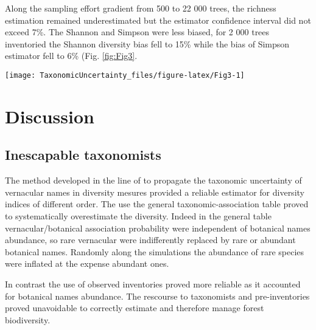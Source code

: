 \documentclass[fleqn,10pt]{ArtEcoFoG} %
\begin{document}
Along the sampling effort gradient from 500 to 22 000 trees, the
richness estimation remained underestimated but the estimator confidence
interval did not exceed 7\%. The Shannon and Simpson were less biased,
for 2 000 trees inventoried the Shannon diversity bias fell to 15\%
while the bias of Simpson estimator fell to 6\% (Fig. \ref{fig:Fig3}.

\begin{figure*}
\texttt{[image: TaxonomicUncertainty\_files/figure-latex/Fig3-1]} \caption{Degradation along a sampling effort gradient of the Richness, Shannon and Simpson diversities estimated for the reference inventory in vernacular names. The propagation method to estimate the diversities is only based on the reference field inventory. Above plots correspond to the estimated diversity in equivalent number of species and below plots correspond to the relative bias of the estimation compared to the value of the reference field inventory. For both dashed lines represent the value of the reference field inventory and crosses and red lines respectively represent the mean, 0.05 and 0.95 quantiles estimated after 1000 iterations.}\label{fig:Fig3}
\end{figure*}

\section{Discussion}\label{discussion}

\subsection{Inescapable taxonomists}\label{inescapable-taxonomists}

The method developed in the line of \citet{Guitet2014b} to propagate the
taxonomic uncertainty of vernacular names in diversity mesures provided
a reliable estimator for diversity indices of different order. The use
the general taxonomic-association table proved to systematically
overestimate the diversity. Indeed in the general table
vernacular/botanical association probability were independent of
botanical names abundance, so rare vernacular were indifferently
replaced by rare or abundant botanical names. Randomly along the
simulations the abundance of rare species were inflated at the expense
abundant ones.

In contrast the use of observed inventories proved more reliable as it
accounted for botanical names abundance. The rescourse to taxonomists
and pre-inventories proved unavoidable to correctly estimate and
therefore manage forest biodiversity.
\end{document}
